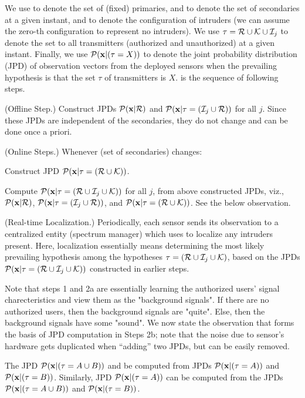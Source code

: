 We use \Pa to denote the set of (fixed) primaries, and \Ka to denote
the set of secondaries at a given instant, and \ii to denote the \jth
configuration of intruders (we can assume the zero-th configuration to
represent no intruders). We use $\tau = \mathcal{R} \cup \mathcal{K} \cup \mathcal{I}_{j}$ to denote the
set to all transmitters (authorized and unauthorized) at a given
instant.  Finally, we use $\mathcal{P}(\mathbf{x} | (\tau = X))$ to denote the joint
probability distribution (JPD) of observation vectors from the
deployed sensors when the prevailing hypothesis is that the set $\tau$
of transmitters is $X$. \ouralgoss is the sequence of following steps.
\begin{packedenumerate}
	\item
	(Offline Step.) Construct JPDs $\mathcal{P}(\mathbf{x} | \mathcal{R})$ and $\mathcal{P}(\mathbf{x} | \tau = (\mathcal{I}_{j} \cup \mathcal{R}))$ for all $j$. Since these JPDs 
	are independent of the secondaries, they do not change and
	can be done once a priori.
	\item
	(Online Steps.) Whenever \Ka (set of secondaries) changes:
	\begin{packedalpha}
		\item Construct JPD $\mathcal{P}(\mathbf{x} | \tau = (\mathcal{R} \cup \mathcal{K}))$. 
		\item Compute $\mathcal{P}(\mathbf{x} | \tau = (\mathcal{R} \cup \mathcal{I}_{j} \cup
                  \mathcal{K}))$ for all $j$, from above constructed JPDs,
                  viz., $\mathcal{P}(\mathbf{x} | \mathcal{R})$, $\mathcal{P}(\mathbf{x} | \tau = (\mathcal{I}_{j} \cup
                  \mathcal{R}))$, and $\mathcal{P}(\mathbf{x} | \tau = (\mathcal{R} \cup \mathcal{K}))$. See
                  the below observation.
	\end{packedalpha}
	\item
	(Real-time Localization.) Periodically, each sensor sends its
          observation to a centralized entity (spectrum
          manager) which uses \ouralgo to localize any intruders
          present. Here, localization essentially means determining
          the most likely prevailing hypothesis among the hypotheses
          $\tau = (\mathcal{R} \cup \mathcal{I}_{j} \cup \mathcal{K})$, based on the JPDs $\mathcal{P}(\mathbf{x} | \tau = (\mathcal{R} \cup \mathcal{I}_{j} \cup \mathcal{K}))$ constructed in earlier
          steps.
\end{packedenumerate}

Note that steps 1 and 2a are essentially learning the authorized users' signal charecteristics and view them as the "background signals". 
If there are no authorized users, then the background signals are "quite". Else, then the background signals have some "sound".
We now state the observation that forms the basis of JPD computation
in Steps 2b; note that the noise due to sensor's hardware gets
duplicated when ``adding'' two JPDs, but can be easily removed.
\begin{obs}
  The JPD $\mathcal{P}(\mathbf{x} | (\tau = A \cup B))$ and be computed from JPDs $\mathcal{P}(\mathbf{x} | (\tau = A))$ and $\mathcal{P}(\mathbf{x} | (\tau = B))$.  Similarly,
  JPD $\mathcal{P}(\mathbf{x} | (\tau = A))$ can be computed from the JPDs $\mathcal{P}(\mathbf{x} | (\tau = A
\cup B))$ and $\mathcal{P}(\mathbf{x} | (\tau = B))$.
\end{obs}

